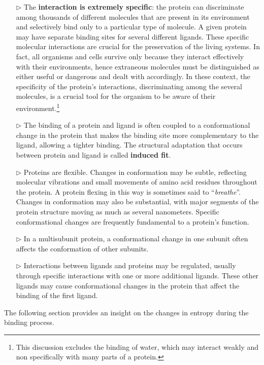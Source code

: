 \begin{itemize}
\item[$\triangleright$] The \textbf{interaction is extremely specific}: the protein can discriminate among thousands of different molecules that are present in its environment and selectively bind only to a particular type of molecule.  A given protein may have separate binding sites for several different ligands. These specific molecular interactions are crucial for the preservation of the living systems. In fact, all organisms and cells survive only because they interact effectively with their environments, hence extraneous molecules must be distinguished as either useful or dangerous and dealt with accordingly.  In these context, the specificity of the protein's interactions, discriminating among the several molecules, is a crucial tool for the organism to be aware of their environment.\footnote{This discussion excludes the binding of water, which may interact weakly and non specifically with many parts of a protein.}  

\item[$\triangleright$] The binding of a protein and ligand is often coupled to a conformational change in the protein that makes the binding site more complementary to the ligand, allowing a tighter binding. The structural adaptation that occurs between protein and ligand is called \textbf{induced fit}.

\item[$\triangleright$] Proteins are flexible. Changes in conformation may be subtle, reflecting molecular vibrations and small movements of amino acid residues throughout the protein. A protein flexing in this way is sometimes said to ``\textit{breathe}''. Changes in conformation may also be substantial, with major segments of the protein structure moving as much as several nanometers. Specific conformational changes are frequently fundamental to a protein's function. 
\item[$\triangleright$] In a multisubunit protein, a conformational change in one subunit often affects the conformation of other subunits. 
\item[$\triangleright$] Interactions between ligands and proteins may be regulated, usually through specific interactions with one or more additional ligands. These other ligands may cause conformational changes in the protein that affect the binding of the first ligand.  
\end{itemize}


The following section provides an insight on the changes in entropy during the binding process.

